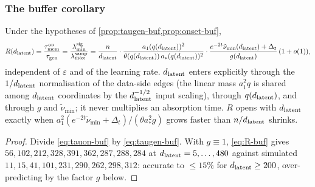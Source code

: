 \subsubsection{The buffer corollary}

\begin{corollary}\label{cor:buffer-buf}
Under the hypotheses of \cref{prop:taugen-buf,prop:onset-buf},
\begin{equation}
R(d_{\mathrm{latent}})=\frac{\tau_{\mathrm{mem}}^{\rm on}}{\tau_{\mathrm{gen}}}=\frac{\lambda^{\rm sig}_{\min}}{\lambda^{\rm samp}_{\max}}
=\frac{n}{d_{\mathrm{latent}}}\cdot\frac{a_1(q(d_{\mathrm{latent}}))^2}{\theta(q(d_{\mathrm{latent}}))\,a_*(q(d_{\mathrm{latent}}))^2}\cdot\frac{e^{-2t}\tilde\nu_{\min}(d_{\mathrm{latent}})+\Delta_t}{g(d_{\mathrm{latent}})}\,(1+o(1)),
\label{eq:R-buf}
\end{equation}
independent of $\varepsilon$ and of the learning rate. $d_{\mathrm{latent}}$ enters explicitly through the $1/d_{\mathrm{latent}}$ normalisation of the data-side edges (the linear mass $a_1^2q$ is shared among $d_{\mathrm{latent}}$ coordinates by the $d_{\mathrm{latent}}^{-1/2}$ input scaling), through $q(d_{\mathrm{latent}})$, and through $g$ and $\tilde\nu_{\min}$; it never multiplies an absorption time. $R$ opens with $d_{\mathrm{latent}}$ exactly when $a_1^2(e^{-2t}\tilde\nu_{\min}+\Delta_t)/(\theta a_*^2g)$ grows faster than $n/d_{\mathrm{latent}}$ shrinks.
\end{corollary}
\begin{proof}
Divide \eqref{eq:tauon-buf} by \eqref{eq:taugen-buf}. With $g\equiv1$, \eqref{eq:R-buf} gives $56,102,212,328,391,362,287,288,284$ at $d_{\mathrm{latent}}=5,\dots,480$ against simulated $11,15,41,101,231,290,262,298,312$: accurate to $\le15\%$ for $d_{\mathrm{latent}}\ge200$, over-predicting by the factor $g$ below.
\end{proof}

